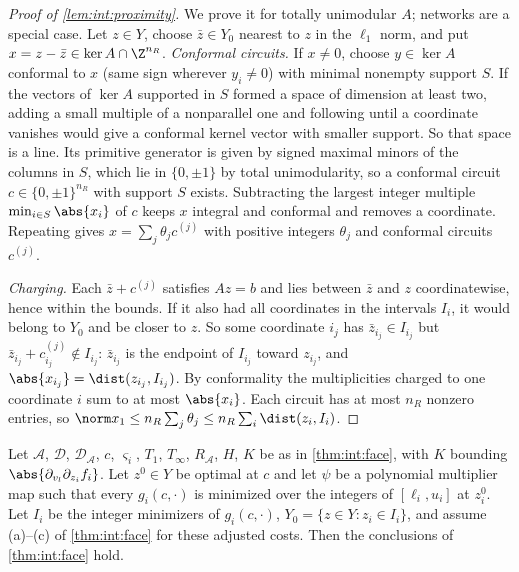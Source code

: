 \begin{proof}[Proof of \cref{lem:int:proximity}]
We prove it for totally unimodular $A$; networks are a special case. Let $z\in Y$,
choose $\bar z\in Y_0$ nearest to $z$ in the $\ell_1$ norm, and put $x=z-\bar z\in
\ker A\cap\Z^{n_R}$. \emph{Conformal circuits.} If $x\ne0$, choose $y\in\ker A$
conformal to $x$ (same sign wherever $y_i\ne0$) with minimal nonempty support $S$. If
the vectors of $\ker A$ supported in $S$ formed a space of dimension at least two,
adding a small multiple of a nonparallel one and following until a coordinate
vanishes would give a conformal kernel vector with smaller support. So that space
is a line. Its primitive generator is given by signed maximal minors of the columns
in $S$, which lie in $\{0,\pm1\}$ by total unimodularity, so a conformal circuit
$c\in\{0,\pm1\}^{n_R}$ with support $S$ exists. Subtracting the largest integer
multiple $\min_{i\in S}\abs{x_i}$ of $c$ keeps $x$ integral and conformal and removes
a coordinate. Repeating gives $x=\sum_j\theta_jc^{(j)}$ with positive integers
$\theta_j$ and conformal circuits $c^{(j)}$.

\emph{Charging.} Each $\bar z+c^{(j)}$ satisfies $Az=b$ and lies between $\bar z$
and $z$ coordinatewise, hence within the bounds. If it also had all coordinates in
the intervals $I_i$, it would belong to $Y_0$ and be closer to $z$. So some
coordinate $i_j$ has $\bar z_{i_j}\in I_{i_j}$ but $\bar z_{i_j}+c^{(j)}_{i_j}\notin
I_{i_j}$: $\bar z_{i_j}$ is the endpoint of $I_{i_j}$ toward $z_{i_j}$, and
$\abs{x_{i_j}}=\dist(z_{i_j},I_{i_j})$. By conformality the multiplicities charged
to one coordinate $i$ sum to at most $\abs{x_i}$. Each circuit has at most $n_R$
nonzero entries, so $\norm x_1\le n_R\sum_j\theta_j\le n_R\sum_i\dist(z_i,I_i)$.
\end{proof}

\begin{lemma}\label{lem:int:face-general}
Let $\mathcal A$, $\mathcal D$, $\mathcal D_{\mathcal A}$, $c$, $\varsigma_i$, $T_1$,
$T_\infty$, $R_{\mathcal A}$, $H$, $K$ be as in \cref{thm:int:face}, with $K$ bounding
$\abs{\partial_{v_l}\partial_{z_i}f_i}$. Let $z^0\in Y$ be optimal at $c$ and let
$\psi$ be a polynomial multiplier map such that every $g_i(c,\cdot)$ is minimized over
the integers of $[\ell_i,u_i]$ at $z^0_i$. Let $I_i$ be the integer minimizers of
$g_i(c,\cdot)$, $Y_0=\{z\in Y:z_i\in I_i\}$, and assume (a)--(c) of
\cref{thm:int:face} for these adjusted costs. Then the conclusions of
\cref{thm:int:face} hold.
\end{lemma}

